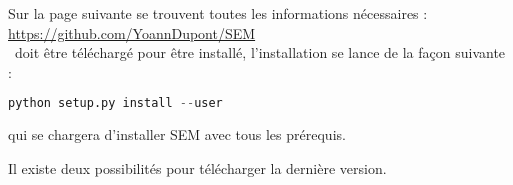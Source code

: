 \documentclass[manual-fr.tex]{subfiles}
\begin{document}
Sur la page suivante se trouvent toutes les informations nécessaires :\\

\url{https://github.com/YoannDupont/SEM} \\

\SEM\ doit être téléchargé pour être installé, l'installation se lance de la façon suivante :

\begin{lstlisting}[language=Python]
python setup.py install --user
\end{lstlisting}

qui se chargera d'installer SEM avec tous les prérequis.

Il existe deux possibilités pour télécharger la dernière version.
\end{document}
